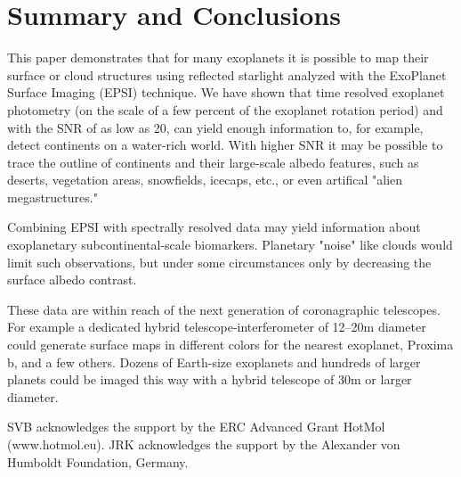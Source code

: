 \documentclass{emulateapj}
\begin{document}
\section{Summary and Conclusions}\label{sec:con}

This paper demonstrates that for many exoplanets it is possible to map 
their surface or cloud structures using reflected starlight analyzed 
with the ExoPlanet Surface Imaging (EPSI) technique. 
We have shown that time resolved exoplanet 
photometry (on the scale of a few percent of the exoplanet rotation period) 
and with the SNR of as low as 20, can yield enough information to, for example, detect
continents on a water-rich world. With higher SNR it may be possible to trace the outline of continents
and their large-scale albedo features, such as deserts, vegetation areas, snowfields, icecaps, etc., 
or even  artifical "alien megastructures."

Combining EPSI with spectrally resolved 
data may yield information about exoplanetary subcontinental-scale
biomarkers. Planetary "noise" like clouds would limit such observations, 
but under some circumstances only by decreasing the surface albedo contrast. 

These data are within reach of the next generation of coronagraphic telescopes. 
For example a dedicated hybrid telescope-interferometer of 12--20m diameter could
generate surface maps in different colors for the nearest exoplanet, Proxima b, and a few others. 
Dozens of Earth-size exoplanets and hundreds of larger planets 
could be imaged this way with a hybrid telescope of 30m or larger diameter.


SVB acknowledges the support by the ERC Advanced Grant HotMol (www.hotmol.eu). 
JRK acknowledges the support by the Alexander von Humboldt Foundation, Germany.
\end{document}
